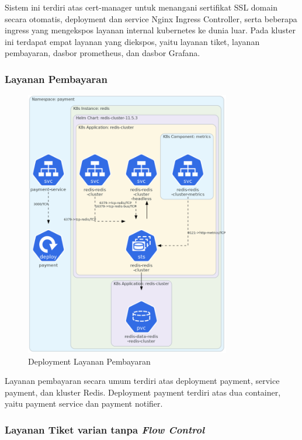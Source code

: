 Sistem ini terdiri atas cert-manager untuk menangani sertifikat SSL domain secara otomatis, deployment dan service Nginx Ingress Controller, serta beberapa ingress yang mengekspos layanan internal kubernetes ke dunia luar. Pada kluster ini terdapat empat layanan yang diekspos, yaitu layanan tiket, layanan pembayaran, dasbor prometheus, dan dasbor Grafana.

\pagebreak

\subsubsection{Layanan Pembayaran}

\begin{figure}[htbp]
    \centering
    \includegraphics[width=0.8\textwidth]{resources/chapter-4/payment.png}
    \caption{Deployment Layanan Pembayaran}
    \label{fig:deployment-payment}
\end{figure}

Layanan pembayaran secara umum terdiri atas deployment payment, service payment, dan kluster Redis. Deployment payment terdiri atas dua container, yaitu payment service dan payment notifier.

\pagebreak

\subsubsection{Layanan Tiket varian tanpa \textit{Flow Control}}

